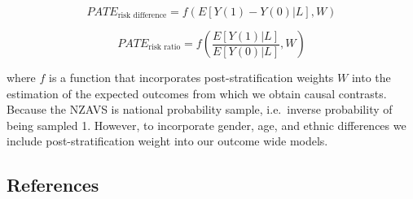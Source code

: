 \documentclass[
  singlecolumn,
  9pt]{article}
\begin{document}
\[PATE_{\text{risk difference}} = f(E[Y(1) - Y(0)|L], W)\]

\[PATE_{\text{risk ratio}} = f\left(\frac{E[Y(1)|L]}{E[Y(0)|L]}, W\right)\]

where \(f\) is a function that incorporates post-stratification weights
\(W\) into the estimation of the expected outcomes from which we obtain
causal contrasts. Because the NZAVS is national probability sample,
i.e.~inverse probability of being sampled 1. However, to incorporate
gender, age, and ethnic differences we include post-stratification
weight into our outcome wide models.

\newpage{}

\subsection*{References}\label{references}
\end{document}
